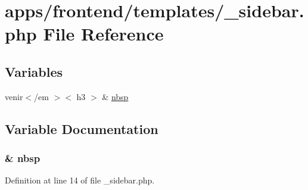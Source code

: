 \hypertarget{frontend_2templates_2__sidebar_8php}{\section{apps/frontend/templates/\-\_\-sidebar.php File Reference}
\label{frontend_2templates_2__sidebar_8php}
}
\subsection*{Variables}
\begin{DoxyCompactItemize}
\item 
venir$<$/em $>$$<$ h3 $>$ \& \hyperlink{frontend_2templates_2__sidebar_8php_aef915316f784c9063d942974538301a6}{nbsp}
\end{DoxyCompactItemize}


\subsection{Variable Documentation}
\hypertarget{frontend_2templates_2__sidebar_8php_aef915316f784c9063d942974538301a6}{
\subsubsection[{nbsp}]{\setlength{\rightskip}{0pt plus 5cm}\& nbsp}}\label{frontend_2templates_2__sidebar_8php_aef915316f784c9063d942974538301a6}


Definition at line 14 of file \-\_\-sidebar.\-php.

